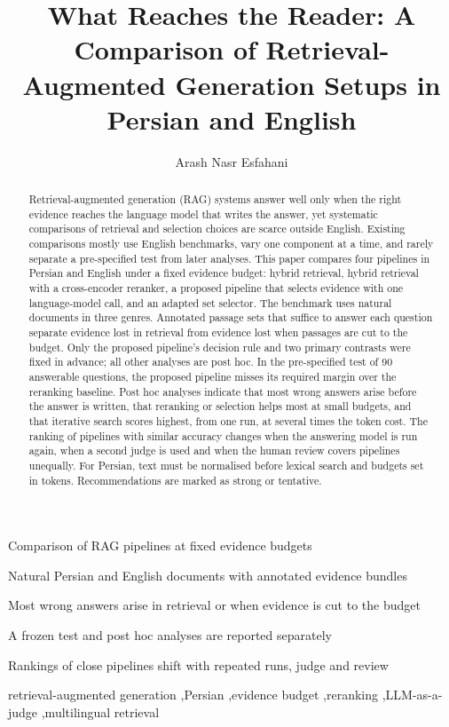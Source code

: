 \title{What Reaches the Reader: A Comparison of Retrieval-Augmented Generation Setups in Persian and English}
\author[ut]{Arash Nasr Esfahani}
\begin{abstract}
Retrieval-augmented generation (RAG) systems answer well only when the right evidence reaches the language model that writes the answer, yet systematic comparisons of retrieval and selection choices are scarce outside English. Existing comparisons mostly use English benchmarks, vary one component at a time, and rarely separate a pre-specified test from later analyses. This paper compares four pipelines in Persian and English under a fixed evidence budget: hybrid retrieval, hybrid retrieval with a cross-encoder reranker, a proposed pipeline that selects evidence with one language-model call, and an adapted set selector. The benchmark uses natural documents in three genres. Annotated passage sets that suffice to answer each question separate evidence lost in retrieval from evidence lost when passages are cut to the budget. Only the proposed pipeline's decision rule and two primary contrasts were fixed in advance; all other analyses are post hoc. In the pre-specified test of 90 answerable questions, the proposed pipeline misses its required margin over the reranking baseline. Post hoc analyses indicate that most wrong answers arise before the answer is written, that reranking or selection helps most at small budgets, and that iterative search scores highest, from one run, at several times the token cost. The ranking of pipelines with similar accuracy changes when the answering model is run again, when a second judge is used and when the human review covers pipelines unequally. For Persian, text must be normalised before lexical search and budgets set in tokens. Recommendations are marked as strong or tentative.
\end{abstract}

\begin{highlights}
\item Comparison of RAG pipelines at fixed evidence budgets
\item Natural Persian and English documents with annotated evidence bundles
\item Most wrong answers arise in retrieval or when evidence is cut to the budget
\item A frozen test and post hoc analyses are reported separately
\item Rankings of close pipelines shift with repeated runs, judge and review
\end{highlights}
\begin{keyword}
retrieval-augmented generation \sep Persian \sep evidence budget \sep reranking \sep LLM-as-a-judge \sep multilingual retrieval
\end{keyword}

